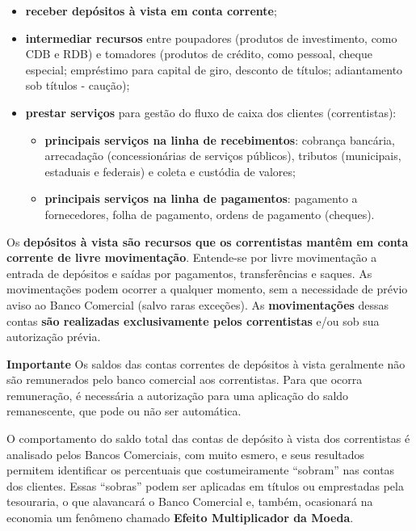 \documentclass{article}\usepackage[]{graphicx}\usepackage[]{xcolor}
\begin{document}
\begin{itemize}
   \item \textbf{receber depósitos à vista em conta corrente};
   
   \item \textbf{intermediar recursos} entre poupadores (produtos de investimento, como CDB e RDB) e tomadores 
(produtos de crédito, como pessoal, cheque especial; empréstimo para capital de giro, desconto de títulos; 
adiantamento sob títulos - caução);

  \item \textbf{prestar serviços} para gestão do fluxo de caixa dos clientes (correntistas):
  
  \begin{itemize}
  
    \item \textbf{principais serviços na linha de recebimentos}: cobrança bancária, arrecadação 
    (concessionárias de serviços públicos), tributos (municipais, estaduais e federais) e coleta e custódia de valores;
    
    \item \textbf{principais serviços na linha de pagamentos}: pagamento a fornecedores, folha de 
    pagamento, ordens de pagamento (cheques).
  
  \end{itemize}
   
\end{itemize}

Os \textbf{depósitos à vista são recursos que os correntistas mantêm em conta corrente de livre movimentação}. 
Entende-se por livre movimentação a entrada de depósitos e saídas por pagamentos, transferências e saques. 
As movimentações podem ocorrer a qualquer momento, sem a necessidade de prévio aviso ao Banco Comercial 
(salvo raras exceções). As \textbf{movimentações} dessas contas \textbf{são realizadas exclusivamente pelos 
correntistas} e/ou sob sua autorização prévia.\par

\textbf{Importante} Os saldos das contas correntes de depósitos à vista geralmente não são remunerados pelo 
banco comercial aos correntistas. Para que ocorra remuneração, é necessária a autorização para uma aplicação 
do saldo remanescente, que pode ou não ser automática.\par

O comportamento do saldo total das contas de depósito à vista dos correntistas é analisado pelos Bancos Comerciais, 
com muito esmero, e seus resultados permitem identificar os percentuais que costumeiramente \enquote{sobram} nas 
contas dos clientes. Essas \enquote{sobras} podem ser aplicadas em títulos ou emprestadas pela tesouraria, 
o que alavancará o Banco Comercial e, também, ocasionará na economia um fenômeno chamado \textbf{Efeito Multiplicador da Moeda}.
\end{document}
